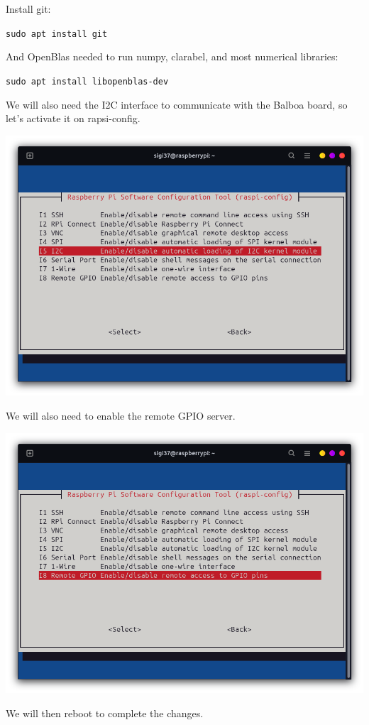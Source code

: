 \documentclass{article}
\begin{document}
Install git:

\texttt{sudo apt install git}

And OpenBlas needed to run numpy, clarabel, and most numerical libraries:

\texttt{sudo apt install libopenblas-dev}

We will also need the I2C interface to communicate with the Balboa board, so let's activate it
on rapsi-config.

\includegraphics[scale=0.37]{img/rapsi_config_i2c.png}

We will also need to enable the remote GPIO server.

\includegraphics[scale=0.37]{img/raspi_config_rgpio.png}

We will then reboot to complete the changes.
\end{document}
